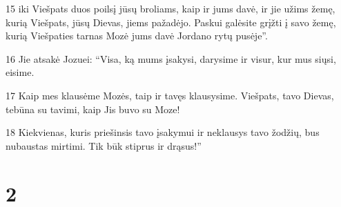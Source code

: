 \par 15 iki Viešpats duos poilsį jūsų broliams, kaip ir jums davė, ir jie užims žemę, kurią Viešpats, jūsų Dievas, jiems pažadėjo. Paskui galėsite grįžti į savo žemę, kurią Viešpaties tarnas Mozė jums davė Jordano rytų pusėje”. 
\par 16 Jie atsakė Jozuei: “Visa, ką mums įsakysi, darysime ir visur, kur mus siųsi, eisime. 
\par 17 Kaip mes klausėme Mozės, taip ir tavęs klausysime. Viešpats, tavo Dievas, tebūna su tavimi, kaip Jis buvo su Moze! 
\par 18 Kiekvienas, kuris priešinsis tavo įsakymui ir neklausys tavo žodžių, bus nubaustas mirtimi. Tik būk stiprus ir drąsus!”


\chapter{2}

